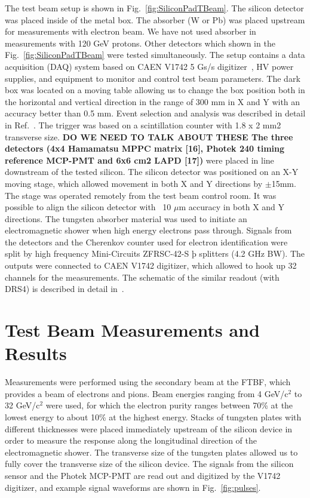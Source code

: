 \documentclass[12pt]{article}
\begin{document}
{The test beam setup is shown in Fig.~\ref{fig:SiliconPadTBeam}. The silicon
detector was placed inside of the metal box. The absorber (W or Pb) was placed
upstream for measurements with electron beam. We have not used absorber in
measurements with 120 GeV protons. Other detectors which shown in the
Fig.~\ref{fig:SiliconPadTBeam} were tested simultaneously. The setup contains a data acquisition (DAQ) system based on CAEN V1742 5 Gs/s
digitizer~\cite{CAENDRS}, HV power supplies, and equipment to monitor and
control test beam parameters. The dark box was located on a moving table
allowing us to change the box position both in the horizontal and vertical
direction in the range of 300 mm in X and Y with an accuracy better than 0.5 mm.
Event selection and analysis was described in detail in
Ref.~\cite{MCPFastCaloNIMA}. The trigger was based on a scintillation counter
with 1.8 x 2 mm2 transverse size. \textbf{DO WE NEED TO TALK ABOUT THESE The
three detectors (4x4 Hamamatsu MPPC matrix [16], Photek 240 timing reference
MCP-PMT and 6x6 cm2 LAPD [17])} were placed in line downstream of the tested
silicon. The silicon detector was positioned on an X-Y moving stage, which
allowed movement in both X and Y directions by $\pm$15mm. The stage was operated
remotely from the test beam control room. It was possible to align the silicon
detector with ~10 $\mu$m accuracy in both X and Y directions. The tungsten absorber material was used to initiate an electromagnetic shower
when high energy electrons pass through. Signals from the detectors and the
Cherenkov counter used for electron identification were split by high frequency
Mini-Circuits ZFRSC-42-S þ splitters (4.2 GHz BW). The outputs were connected to
CAEN V1742 digitizer, which allowed to hook up 32 channels for the measurements.
The schematic of the similar readout (with DRS4) is described in detail in~\cite{Anderson:2015gha}. 

\section{Test Beam Measurements and Results} 
\label{sec:results} 

Measurements were performed using the secondary beam at the FTBF, which provides
a beam of electrons and pions. Beam energies ranging from 4 GeV/c$^2$ to 32 GeV/c$^2$
were used, for which the electron purity ranges between 70\% at the lowest
energy to about 10\% at the highest energy. Stacks of tungsten plates with
different thicknesses were placed immediately upstream of the silicon device in
order to measure the response along the longitudinal direction of the
electromagnetic shower. The transverse size of the tungsten plates allowed us to
fully cover the transverse size of the silicon device. The signals from the
silicon sensor and the Photek MCP-PMT are read out and digitized by the V1742
digitizer, and example signal waveforms are shown in Fig.~\ref{fig:pulses}.

}
\end{document}
